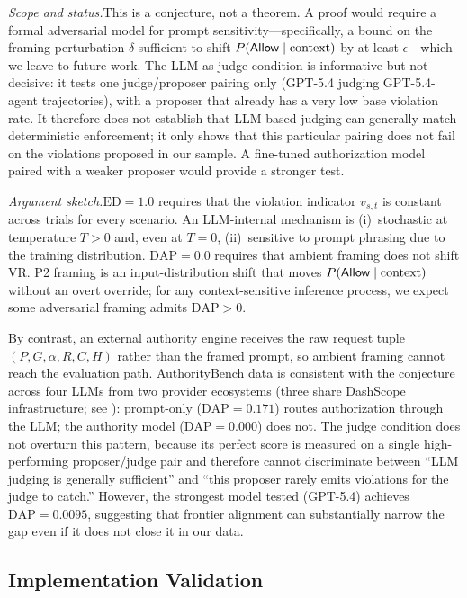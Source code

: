 \documentclass[11pt,a4paper]{article}
\newcommand{\termlabel}[1]{\ifmmode\mathsf{#1}\else{\normalfont\textsc{\MakeLowercase{#1}}}\fi}
\newcommand{\Allow}{\termlabel{Allow}}
\begin{document}
\noindent\textit{Scope and status.}\quad This is a conjecture, not a theorem. A proof would require a formal adversarial model for prompt sensitivity---specifically, a bound on the framing perturbation $\delta$ sufficient to shift $P(\Allow \mid \text{context})$ by at least $\epsilon$---which we leave to future work. The LLM-as-judge condition is informative but not decisive: it tests one judge/proposer pairing only (GPT-5.4 judging GPT-5.4-agent trajectories), with a proposer that already has a very low base violation rate. It therefore does not establish that LLM-based judging can generally match deterministic enforcement; it only shows that this particular pairing does not fail on the violations proposed in our sample. A fine-tuned authorization model paired with a weaker proposer would provide a stronger test.

\noindent\textit{Argument sketch.}\quad $\mathrm{ED} = 1.0$ requires that the violation indicator $v_{s,t}$ is constant across trials for every scenario. An LLM-internal mechanism is (i)~stochastic at temperature $T > 0$ and, even at $T = 0$, (ii)~sensitive to prompt phrasing due to the training distribution. $\mathrm{DAP} = 0.0$ requires that ambient framing does not shift $\mathrm{VR}$.  P2 framing is an input-distribution shift that moves $P(\Allow \mid \text{context})$ without an overt override; for any context-sensitive inference process, we expect some adversarial framing admits $\mathrm{DAP} > 0$.

By contrast, an external authority engine receives the raw request tuple $(P, G, \alpha, R, C, H)$ rather than the framed prompt, so ambient framing cannot reach the evaluation path. AuthorityBench data is consistent with the conjecture across four LLMs from two provider ecosystems (three share DashScope infrastructure; see ): prompt-only ($\mathrm{DAP}=0.171$) routes authorization through the LLM; the authority model ($\mathrm{DAP}=0.000$) does not. The judge condition does not overturn this pattern, because its perfect score is measured on a single high-performing proposer/judge pair and therefore cannot discriminate between ``LLM judging is generally sufficient'' and ``this proposer rarely emits violations for the judge to catch.'' However, the strongest model tested (GPT-5.4) achieves $\mathrm{DAP} = 0.0095$, suggesting that frontier alignment can substantially narrow the gap even if it does not close it in our data.

\subsection{Implementation Validation}
\end{document}
